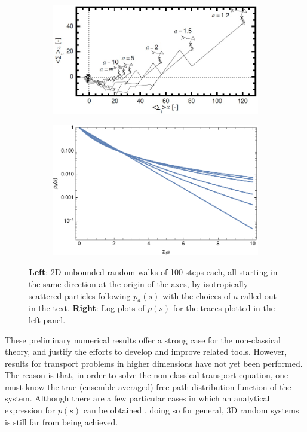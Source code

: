 \documentclass[12pt]{article}
\begin{document}
\begin{figure}[hbt]
    \centering
    \begin{subfigure}{0.49\textwidth}
        \centering
        \includegraphics[width=\textwidth]{fig4a.jpg}
    \end{subfigure}
        \begin{subfigure}{0.49\textwidth}
        \centering
        \includegraphics[width=\textwidth]{fig4b}
    \end{subfigure}
    \caption{\textbf{Left}: 2D unbounded random walks of 100 steps each, all starting in the same direction at the origin of the axes, by isotropically scattered particles following $p_a(s)$ with the choices of $a$ called out in the text. \textbf{Right}: Log plots of $p(s)$ for the traces plotted in the left panel.}\label{fig4}
\end{figure}

These preliminary numerical results offer a strong case for the non-classical theory, and justify the efforts to develop and improve related tools.
However, results for transport problems in higher dimensions have not yet been performed. The reason is that, in order to solve the non-classical transport equation, one must know the true (ensemble-averaged) free-path distribution function of the system.
Although there are a few particular cases in which an analytical expression for $p(s)$ can be obtained \cite{vaskry16,vassla16}, doing so for general, 3D random systems is still far from being achieved.
\end{document}
